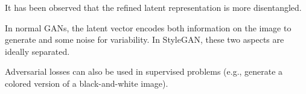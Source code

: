 \begin{description}
        \begin{remark}
            It has been observed that the refined latent representation is more disentangled.
        \end{remark}

        \begin{remark}
            In normal GANs, the latent vector encodes both information on the image to generate and some noise for variability. In StyleGAN, these two aspects are ideally separated.
        \end{remark}
\end{description}

\begin{remark}
    Adversarial losses can also be used in supervised problems (e.g., generate a colored version of a black-and-white image).
\end{remark}
